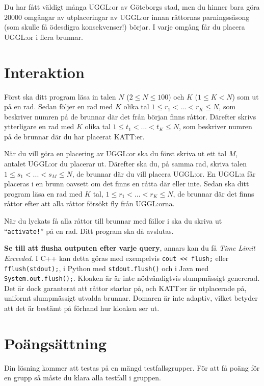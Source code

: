 Du har fått väldigt många UGGL:or av Göteborgs stad, men du hinner bara göra $20000$ omgångar av utplaceringar av UGGL:or innan 
råttornas parningssäsong (som skulle få ödesdigra konsekvenser!) börjar. I varje omgång får du placera UGGL:or i flera brunnar.


\section*{Interaktion}
Först ska ditt program läsa in talen $N$ ($2 \leq N \leq 100$) och $K$ ($1 \leq K < N$) som ut på en rad.
Sedan följer en rad med $K$ olika tal $1 \leq r_1 < ... < r_K \leq N$, som beskriver numren på de brunnar där det från början finns råttor.
Därefter skrivs ytterligare en rad med $K$ olika tal $1 \leq t_1 < ... < t_K \leq N$, som beskriver numren på de brunnar där du har placerat KATT:er.

När du vill göra en placering av UGGL:or ska du först skriva ut ett tal $M$, antalet UGGL:or du placerar ut. 
Därefter ska du, på samma rad, skriva talen $1 \leq s_1 < ... < s_M \leq N$,
de brunnar där du vill placera UGGL:or. En UGGL:a får placeras i en brunn oavsett om det finns en råtta där eller inte.
Sedan ska ditt program läsa en rad med $K$ tal, $1 \leq r_1 < ... < r_K \leq N$, 
de brunnar där det finns råttor efter att alla råttor försökt fly från UGGL:orna.

När du lyckats få alla råttor till brunnar med fällor i ska du skriva ut ``\texttt{activate!}'' på en rad. 
Ditt program ska då avslutas.


\textbf{Se till att flusha outputen efter varje query}, annars kan du få \textit{Time Limit Exceeded}.
I C++ kan detta göras med exempelvis \texttt{cout << flush;}
eller \texttt{fflush(stdout);},
i Python med \texttt{stdout.flush()}
och i Java med \texttt{System.out.flush();}.
Kloaken är är inte nödvändigtvis slumpmässigt genererad. 
Det är dock garanterat att råttor startar på, och KATT:er är utplacerade på, uniformt slumpmässigt utvalda brunnar. 
Domaren är inte adaptiv, vilket betyder att det är bestämt på förhand hur kloaken ser ut.

\section*{Poängsättning}
Din lösning kommer att testas på en mängd testfallsgrupper.
För att få poäng för en grupp så måste du klara alla testfall i gruppen.

